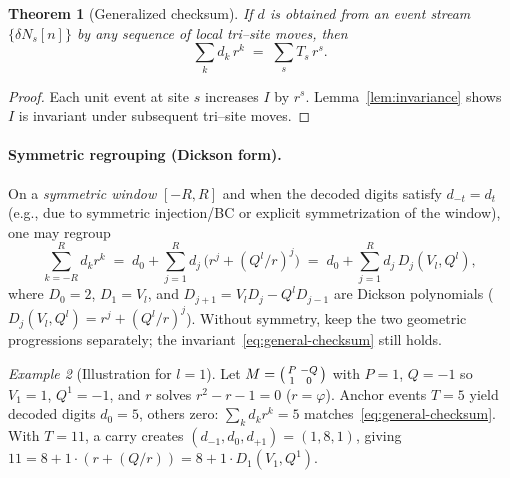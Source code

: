 \documentclass[11pt]{article}
\newtheorem{theorem}{Theorem}[section]
\theoremstyle{definition}
\theoremstyle{remark}
\newtheorem{example}[theorem]{Example}
\begin{document}
\begin{theorem}[Generalized checksum]\label{thm:checksum}
If $d$ is obtained from an event stream $\{\delta N_s[n]\}$ by any sequence of local tri--site moves, then
\begin{equation}\label{eq:general-checksum}
\sum_{k} d_k\,r^k \;=\; \sum_{s} T_s\, r^{s}.
\end{equation}
\end{theorem}
\begin{proof}
Each unit event at site $s$ increases $I$ by $r^s$. Lemma~\ref{lem:invariance} shows $I$ is invariant under subsequent tri--site moves.
\end{proof}

\paragraph{Symmetric regrouping (Dickson form).}
On a \emph{symmetric window} $[-R,R]$ and when the decoded digits satisfy $d_{-t}=d_t$ (e.g., due to symmetric injection/BC or explicit symmetrization of the window), one may regroup
\begin{equation}\label{eq:dickson}
\sum_{k=-R}^{R} d_k r^k \;=\; d_0 + \sum_{j=1}^{R} d_j\,\big(r^j + (Q^l/r)^j\big) \;=\; d_0 + \sum_{j=1}^{R} d_j\,D_j(V_l,Q^l),
\end{equation}
where $D_0=2$, $D_1=V_l$, and $D_{j+1}=V_l D_j - Q^l D_{j-1}$ are Dickson polynomials ($D_j(V_l,Q^l)=r^j+(Q^l/r)^j$).
Without symmetry, keep the two geometric progressions separately; the invariant~\eqref{eq:general-checksum} still holds.

\begin{example}[Illustration for $l=1$]\label{ex:l1}
Let $M=\begin{psmallmatrix}P&-Q\\1&0\end{psmallmatrix}$ with $P=1$, $Q=-1$ so $V_1=1$, $Q^1=-1$, and $r$ solves $r^2-r-1=0$ ($r=\varphi$).
Anchor events $T=5$ yield decoded digits $d_0=5$, others zero: $\sum_k d_k r^k=5$ matches~\eqref{eq:general-checksum}.
With $T=11$, a carry creates $(d_{-1},d_0,d_{+1})=(1,8,1)$, giving $11=8+1\cdot(r+(Q/r))=8+1\cdot D_1(V_1,Q^1)$.
\end{example}
\end{document}
